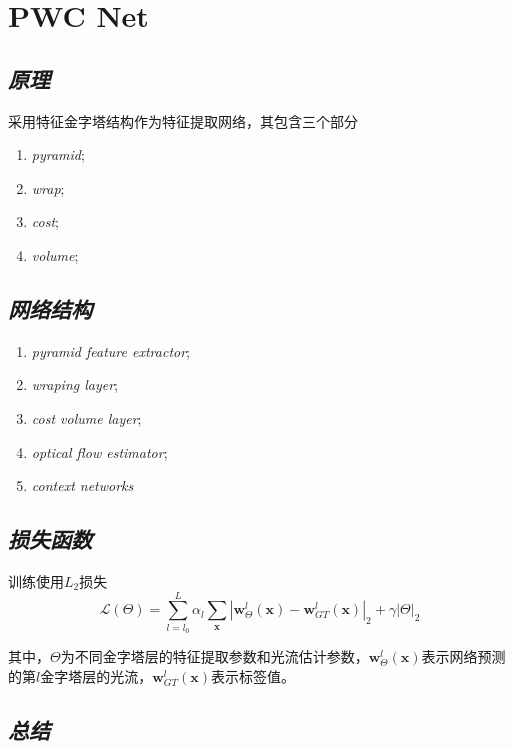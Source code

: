 \section{PWC Net}

\subsection*{\textsl{原理}}

采用特征金字塔结构作为特征提取网络，其包含三个部分
\begin{enumerate}[itemindent=2em]
    \item \textsl{pyramid};
    \item \textsl{wrap};
    \item \textsl{cost};
    \item \textsl{volume};
\end{enumerate}

\subsection*{\textsl{网络结构}}

\begin{enumerate}[itemindent=2em]
    \item \textsl{pyramid feature extractor};
    \item \textsl{wraping layer};
    \item \textsl{cost volume layer};
    \item \textsl{optical flow estimator};
    \item \textsl{context networks}
\end{enumerate}

\subsection*{\textsl{损失函数}}

训练使用$L_2$损失
\begin{equation}
    \mathcal{L}(\Theta)=\sum^{L}_{l=l_0}\alpha_l\sum_{\mathbf{x}}\left| \mathbf{w}^l_\Theta(\mathbf{x})-\mathbf{w}^l_{GT}(\mathbf{x}) \right|_2+\gamma|\Theta|_2
\end{equation}

其中，$\Theta$为不同金字塔层的特征提取参数和光流估计参数，$\mathbf{w}^l_\Theta(\mathbf{x})$表示网络预测的第$l$金字塔层的光流，$\mathbf{w}^l_{GT}(\mathbf{x})$表示标签值。

\subsection*{\textsl{总结}}

